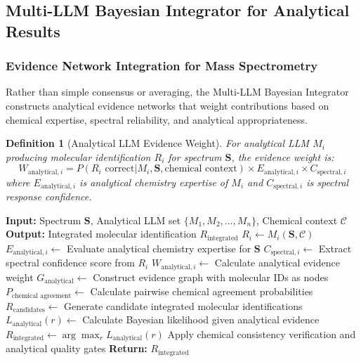 \documentclass[11pt,a4paper]{article}
\newtheorem{definition}[theorem]{Definition}
\theoremstyle{remark}
\begin{document}
{{{{{{{{{{\subsection{Multi-LLM Bayesian Integrator for Analytical Results}

\subsubsection{Evidence Network Integration for Mass Spectrometry}

Rather than simple consensus or averaging, the Multi-LLM Bayesian Integrator constructs analytical evidence networks that weight contributions based on chemical expertise, spectral reliability, and analytical appropriateness.

\begin{definition}[Analytical LLM Evidence Weight]
For analytical LLM $M_i$ producing molecular identification $R_i$ for spectrum $\mathbf{S}$, the evidence weight is:
\begin{equation}
W_{\text{analytical},i} = P(R_i \text{ correct} | M_i, \mathbf{S}, \text{chemical context}) \times E_{\text{analytical},i} \times C_{\text{spectral},i}
\end{equation}
where $E_{\text{analytical},i}$ is analytical chemistry expertise of $M_i$ and $C_{\text{spectral},i}$ is spectral response confidence.
\end{definition}

\begin{algorithm}[H]
\caption{Multi-LLM Bayesian Integration for Mass Spectrometry}
\begin{algorithmic}[1]
\State \textbf{Input:} Spectrum $\mathbf{S}$, Analytical LLM set $\{M_1, M_2, \ldots, M_n\}$, Chemical context $\mathcal{C}$
\State \textbf{Output:} Integrated molecular identification $R_{\text{integrated}}$
    \State $R_i \leftarrow M_i(\mathbf{S}, \mathcal{C})$ 
    \State $E_{\text{analytical},i} \leftarrow$ Evaluate analytical chemistry expertise for $\mathbf{S}$
    \State $C_{\text{spectral},i} \leftarrow$ Extract spectral confidence score from $R_i$
    \State $W_{\text{analytical},i} \leftarrow$ Calculate analytical evidence weight
\EndFor
\State $G_{\text{analytical}} \leftarrow$ Construct evidence graph with molecular IDs as nodes
\State $P_{\text{chemical agreement}} \leftarrow$ Calculate pairwise chemical agreement probabilities
\State $R_{\text{candidates}} \leftarrow$ Generate candidate integrated molecular identifications
    \State $L_{\text{analytical}}(r) \leftarrow$ Calculate Bayesian likelihood given analytical evidence
\EndFor
\State $R_{\text{integrated}} \leftarrow \arg\max_r L_{\text{analytical}}(r)$
\State Apply chemical consistency verification and analytical quality gates
\State \textbf{Return:} $R_{\text{integrated}}$
\end{algorithmic}
\end{algorithm}

}}}}}}}}}}
\end{document}
